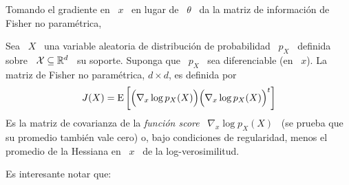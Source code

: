 Tomando  el gradiente  en \  $x$ \  en lugar  de \  $\theta$ \  da la  matriz de
informaci\'on de Fisher no param\'etrica,
%
\begin{definicion}
  Sea \ $X$ \ una variable aleatoria de distribuci\'on de probabilidad \ $p_X$ \
  definida sobre \  $\mathcal{X} \subseteq \mathbb{R}^d$ \ su soporte.  Suponga  que \ $p_X$ \
  sea diferenciable (en \ $x$).  La matriz de Fisher no param\'etrica, $d \times
  d$, es definida por
  \[
  J(X) =  \operatorname{E}\left[ \Big(  \nabla_x \log p_X(X)  \Big) \Big(  \nabla_x \log
      p_X(X) \Big)^t \right]
  \]
  Es  la matriz  de covarianza  de  la {\it  funci\'on score}  \ $\nabla_x  \log
  p_X(X)$ \ (se prueba que su  promedio tambi\'en vale cero) o, bajo condiciones
  de  regularidad,  menos  el  promedio  de  la  Hessiana  en  \  $x$  \  de  la
  log-verosimilitud.
\end{definicion}
%
Es interesante notar que:
%
